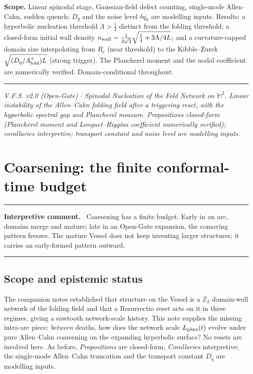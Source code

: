 \documentclass[11pt,a4paper]{article}
\newcommand{\Hh}{\mathbb{H}^2}
\newcommand{\Af}{A_{\rm fold}}
\newcommand{\Dq}{D_q}
\newcommand{\Lphys}{L_{\rm phys}}
\newcommand{\Lam}{\Lambda}
\newcommand{\Rc}{R_c}
\newenvironment{commentbox}[1]{\begin{center}\begin{minipage}{0.90\textwidth}\hrule\vspace{0.45em}\textbf{#1.}\ }{\vspace{0.45em}\hrule\end{minipage}\end{center}}
\theoremstyle{plain}
\theoremstyle{definition}
\theoremstyle{remark}
\begin{document}
\textbf{Scope.} Linear spinodal stage, Gaussian-field defect counting, single-mode Allen--Cahn, sudden
quench; $\Dq$ and the noise level $\delta q_0$ are modelling inputs. Results: a hyperbolic nucleation
threshold $\Lam>\tfrac14$ distinct from the folding threshold; a closed-form initial wall density
$n_{\rm wall}=\tfrac{1}{2\sqrt2}\sqrt{\tfrac14+3\Lam/4L}$; and a curvature-capped domain size interpolating
from $\Rc$ (near threshold) to the Kibble--Zurek $\sqrt{(\Dq/\Af^+)L}$ (strong trigger). The Plancherel
moment and the nodal coefficient are numerically verified. Domain-conditional throughout.

\vspace{0.5em}
\hrule
\smallskip
\noindent\footnotesize\emph{V.F.S. v2.0 (Open-Gate) $\cdot$ Spinodal Nucleation of the Fold Network on
$\Hh$. Linear instability of the Allen--Cahn folding field after a triggering reset, with the hyperbolic
spectral gap and Plancherel measure. Propositions closed-form (Plancherel moment and Longuet--Higgins
coefficient numerically verified); corollaries interpretive; transport constant and noise level are
modelling inputs.}
\newpage
\section{Coarsening: the finite conformal-time budget}
\begin{commentbox}{Interpretive comment}
Coarsening has a finite budget.  Early in an arc, domains merge and mature; late in an Open-Gate expansion, the comoving pattern freezes.  The mature Vessel does not keep inventing larger structures; it carries an early-formed pattern outward.
\end{commentbox}
\subsection*{Scope and epistemic status}
The companion notes established that structure on the Vessel is a $\mathbb Z_2$ domain-wall network of the
folding field and that a Resurrectio reset acts on it in three regimes, giving a sawtooth network-scale
history. This note supplies the missing intra-arc piece: \emph{between} deaths, how does the network scale
$\Lphys(t)$ evolve under pure Allen--Cahn coarsening on the expanding hyperbolic surface? No resets are
involved here. As before, \emph{Propositions} are closed-form, \emph{Corollaries} interpretive; the
single-mode Allen--Cahn truncation and the transport constant $\Dq$ are modelling inputs.
\end{document}
